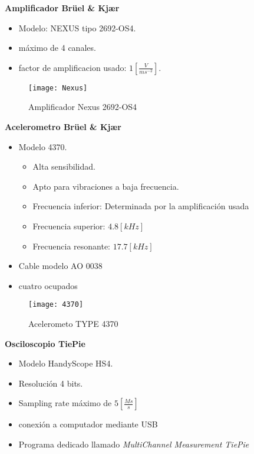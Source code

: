             \vspace{0.5cm}
            \textbf{Amplificador Br\"uel \& Kj\ae r}
            \begin{itemize}
                \item Modelo: NEXUS tipo 2692-OS4.
                \item máximo de 4 canales.
                \item factor de amplificacion usado: $1 \left[\frac{V}{ms^{-2}}\right]$.
            \end{itemize}
            \begin{figure}[H]
                \centering
                \texttt{[image: Nexus]}
                \caption{Amplificador Nexus 2692-OS4}
                \label{fig:NEXUS}
            \end{figure}
            \vspace{0.5cm}
            \textbf{Acelerometro Br\"uel \& Kj\ae r}
            \begin{itemize}
                \item Modelo 4370.
                \begin{itemize}
                    \item Alta sensibilidad.
                    \item Apto para vibraciones a baja frecuencia.
                    \item Frecuencia inferior: Determinada por la amplificación usada
                    \item Frecuencia superior: $4.8 [kHz]$
                    \item Frecuencia resonante: $17.7 [kHz]$
                \end{itemize}
                \item Cable modelo AO 0038
                \item cuatro ocupados
            \end{itemize}
            \begin{figure}[H]
                \centering
                \texttt{[image: 4370]}
                \caption{Acelerometo TYPE 4370}
                \label{fig:4370}
            \end{figure}
            \vspace{1cm}
            \textbf{Osciloscopio TiePie}
            \begin{itemize}
                \item Modelo HandyScope HS4.
                \item Resolución 4 bits.
                \item Sampling rate máximo de $5\left[\frac{Ms}{s}\right]$
                \item conexión a computador mediante USB
                \item Programa dedicado llamado \textit{MultiChannel Measurement TiePie}
            \end{itemize}
